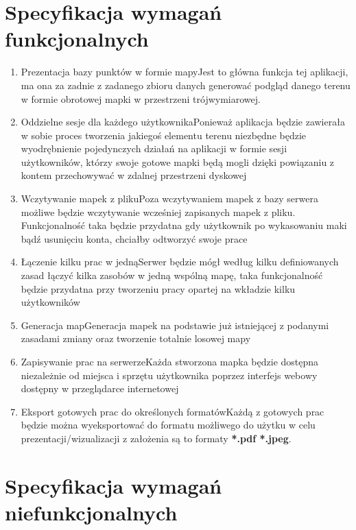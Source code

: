 \section{Specyfikacja wymagań funkcjonalnych}
\begin{enumerate}
  \item{Prezentacja bazy punktów w formie mapy}{Jest to główna funkcja tej aplikacji, ma ona za zadnie z zadanego zbioru danych generować podgląd danego terenu w formie obrotowej mapki w przestrzeni trójwymiarowej.}
\newpage
  \item{Oddzielne sesje dla każdego użytkownika}{Ponieważ aplikacja będzie zawierała w sobie proces tworzenia jakiegoś elementu terenu niezbędne będzie wyodrębnienie pojedynczych działań na aplikacji w formie sesji użytkowników, którzy swoje gotowe mapki będą mogli dzięki powiązaniu z kontem przechowywać w zdalnej przestrzeni dyskowej}
  \item{Wczytywanie mapek z pliku}{Poza wczytywaniem mapek z bazy serwera możliwe będzie wczytywanie wcześniej zapisanych mapek z pliku. Funkcjonalność taka będzie przydatna gdy użytkownik po wykasowaniu maki bądź usunięciu konta, chciałby odtworzyć swoje prace}
  \item{Łączenie kilku prac w jedną}{Serwer będzie mógł według kilku definiowanych zasad łączyć kilka zasobów w jedną wspólną mapę, taka funkcjonalność będzie przydatna przy tworzeniu pracy opartej na wkładzie kilku użytkowników}
  \item{Generacja map}{Generacja mapek na podstawie już istniejącej z podanymi zasadami zmiany oraz tworzenie totalnie losowej mapy}
  \item{Zapisywanie prac na serwerze}{Każda stworzona mapka będzie dostępna niezależnie od miejsca i sprzętu użytkownika poprzez interfejs webowy dostępny w przeglądarce internetowej}
  \item{Eksport gotowych prac do określonych formatów}{Każdą z gotowych prac będzie można wyeksportować do formatu możliwego do użytku w celu prezentacji/wizualizacji z założenia są to formaty
\textbf{*.pdf *.jpeg}.}
\end{enumerate}

\section{Specyfikacja wymagań niefunkcjonalnych}

